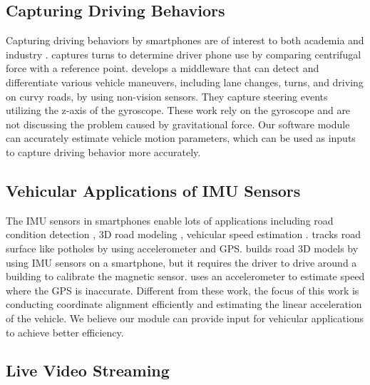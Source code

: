 \subsection{Capturing Driving Behaviors}

Capturing driving behaviors by smartphones are of interest
to both academia \cite{wang2013sensing, chen2015invisible} 
and industry \cite{uber, cmtelematics}. 
\cite{wang2013sensing} captures turns to determine driver phone
use by comparing centrifugal force with a reference point. 
\cite{chen2015invisible} develops a middleware that can detect 
and differentiate various vehicle maneuvers, 
including lane changes, turns, and driving on curvy roads,
by using non-vision sensors.
They capture steering events utilizing the z-axis of the gyroscope.
These work rely on the gyroscope and are not 
discussing the problem caused by gravitational force. 
Our software module can accurately estimate vehicle motion
parameters, which can be used as inputs to 
capture driving behavior more accurately. 

\subsection{Vehicular Applications of IMU Sensors}

The IMU sensors in smartphones enable lots of applications
including road condition detection \cite{Mohan2008Nericell},
3D road modeling \cite{yang2015low}, vehicular speed estimation \cite{hansenspeed}.
\cite{Mohan2008Nericell} tracks road surface like 
potholes by using accelerometer and GPS.
\cite{yang2015low} builds road 3D models by using IMU sensors on  a smartphone, but it requires the driver to drive 
around a building to calibrate the magnetic sensor. 
\cite{hansenspeed} uses an accelerometer to estimate speed 
where the GPS is inaccurate. 
Different from these work, the focus of this work is 
conducting coordinate alignment efficiently and estimating the linear acceleration of the vehicle.
We believe our module can provide input for vehicular applications 
to achieve better efficiency. 




\subsection{Live Video Streaming}

